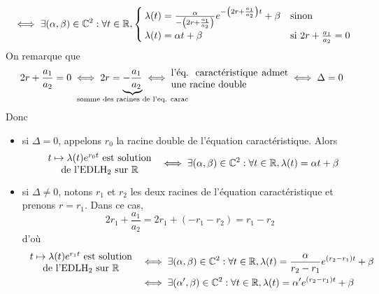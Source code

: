 \documentclass{article}
\begin{document}
\begin{question_kholle}
\begin{align*}
       & \iff \exists (\alpha, \beta)\in\mathbb C^{2}: \forall t\in\mathbb R, \begin{cases}
                                                                  \lambda(t)=\frac{\alpha}{-\left(2r+\frac{a_{1}}{a_{2}}\right)}e^{-\left(2r+\frac{a_{1}}{a_{2}}\right)t}+\beta & \text{sinon}                        \\
                                                                  \lambda(t)=\alpha t+\beta                                                                                     & \text{si } 2r+\frac{a_{1}}{a_{2}}=0
                                                                \end{cases} \\
  \end{align*}
  On remarque que
  \[
    2r+\frac{a_{1}}{a_{2}}=0 \iff 2r=\underbrace{-\frac{a_{1}}{a_{2}}}_{\mathclap{\text{somme des racines de l’eq. carac}}} \iff \parbox{12em}{l'éq. caractéristique admet une racine double} \iff \Delta=0
  \]
  Donc
  \begin{itemize}[label=$\star$]
    \item si $\Delta=0$, appelons $r_{0}$ la racine double de l'équation caractéristique. Alors
          \[
            \parbox{12em}{\centering$t\mapsto \lambda(t) e^{r_{0}t}$ est solution                                                                                                                                                                                            \\ de l’$\mathrm{EDLH_{2}}$ sur \R} \iff \exists(\alpha, \beta)\in\C^{2}: \forall t\in\R, \lambda(t)=\alpha t + \beta
          \]
    \item si $\Delta\neq 0$, notons $r_{1}$ et $r_{2}$ les deux racines de l'équation caractéristique et prenons $r=r_{1}$. Dans ce cas,
          \[
            2r_{1}+\frac{a_{1}}{a_{2}} = 2r_{1} + (-r_{1}-r_{2}) = r_{1}-r_{2}
          \]
          d'où
          \begin{align*}
            \parbox{12em}{\centering$t\mapsto \lambda(t) e^{r_{1}t}$ est solution                                    \\ de l’$\mathrm{EDLH_{2}}$ sur \R} & \iff \exists(\alpha, \beta)\in\C^{2}: \forall t\in\R, \lambda(t)=\frac{\alpha}{r_{2}-r_{1}}e^{(r_{2}-r_{1})t}+\beta \\
             & \iff \exists (\alpha ', \beta)\in\C^{2}: \forall t\in\R, \lambda(t)=\alpha ' e^{(r_{2}-r_{1})t}+\beta
          \end{align*}

\end{itemize}
\end{question_kholle}
\end{document}

